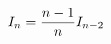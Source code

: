 \documentclass[preview]{standalone}
\begin{document}
\begin{align*}
I_n = {n-1 \over n} I_{n-2}
\end{align*}
\end{document}
